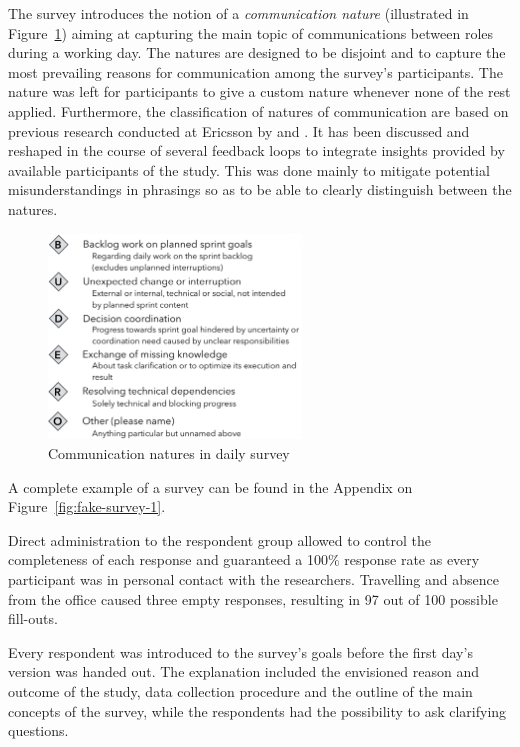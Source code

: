 The survey introduces the notion of a \emph{communication nature} (illustrated in Figure~\ref{fig:survey-natures}) aiming at capturing the main topic of communications between roles during a working day. The natures are designed to be disjoint and to capture the most prevailing reasons for communication among the survey's participants. The nature  was left for participants to give a custom nature whenever none of the rest applied.
Furthermore, the classification of natures of communication are based on previous research conducted at Ericsson by \citet{nelson2013technicaldependencies} and \citet{boerjesson2013}. It has been discussed and reshaped in the course of several feedback loops to integrate insights provided by available participants of the study. This was done mainly to mitigate potential misunderstandings in phrasings so as to be able to clearly distinguish between the natures.

\begin{figure}[h!]
  \centering
  \includegraphics[width=0.60\textwidth]{figures/fake-partial-nature.png}
  \caption{Communication natures in daily survey}
  \label{fig:survey-natures}
\end{figure}

A complete example of a survey can be found in the Appendix on Figure~\ref{fig:fake-survey-1}. 

Direct administration to the respondent group allowed to control the completeness of each response and guaranteed a 100\% response rate as every participant was in personal contact with the researchers. Travelling and absence from the office caused three empty responses, resulting in 97 out of 100 possible fill-outs.

Every respondent was introduced to the survey's goals before the first day's version was handed out. The explanation included the envisioned reason and outcome of the study, data collection procedure and the outline of the main concepts of the survey, while the respondents had the possibility to ask clarifying questions.

